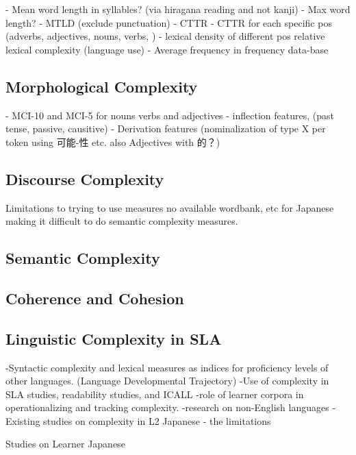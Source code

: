     - Mean word length in syllables? (via hiragana reading and not kanji)
    - Max word length?
    - MTLD (exclude punctuation)
    - CTTR
    - CTTR for each specific pos (adverbs, adjectives, nouns, verbs, )
    - lexical density of different pos
relative lexical complexity (language use)
    - Average frequency in frequency data-base

\subsection{Morphological Complexity}
    - MCI-10 and MCI-5 for nouns verbs and adjectives
    - inflection features, (past tense, passive, causitive)
    - Derivation features (nominalization of type X per token using 可能-性 etc. also Adjectives with 的？)


\subsection{Discourse Complexity}
Limitations to trying to use measures no available wordbank, etc for Japanese making it difficult to do semantic
complexity measures.
\subsection{Semantic Complexity}
\subsection{Coherence and Cohesion}

\subsection{Linguistic Complexity in SLA}
-Syntactic complexity and lexical measures as indices for proficiency levels of other languages. (Language Developmental Trajectory)
-Use of complexity in SLA studies, readability studies, and ICALL
-role of learner corpora in operationalizing and tracking complexity.
-research on non-English languages
-Existing studies on complexity in L2 Japanese - the limitations

Studies on Learner Japanese


